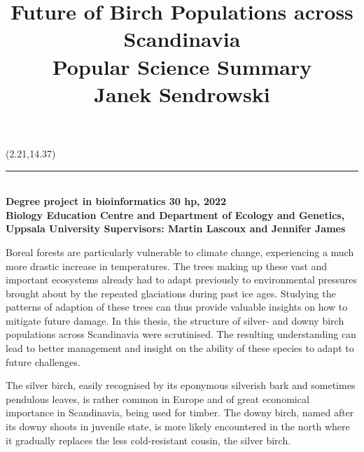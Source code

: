 \documentclass[hidelinks,11pt]{article}
\begin{document}
    \clearpage
    \shipout\null

    \begingroup
    \fontsize{10pt}{12pt}\selectfont

    \setlength{\droptitle}{-1em}
    \title{Future of Birch Populations across Scandinavia\\
    \vspace{0.3em}
    \Large Popular Science Summary\\
    \vspace{0.3em}
    Janek Sendrowski}
    \date{}
    \begin{textblock}{10}(2.21,14.37)
        \begin{flushleft}
            \rule{44.48em}{1pt} \\
            \vspace{-0.02cm}
            \fontsize{9pt}{10.5pt}\color{gray}\textbf{Degree project in bioinformatics 30 hp, 2022 \\
            Biology Education Centre and Department of Ecology and Genetics, \\
            Uppsala University Supervisors: Martin Lascoux and Jennifer James \\}
        \end{flushleft}
    \end{textblock}

    \maketitle
    \vspace{-4.5em}
    Boreal forests are particularly vulnerable to climate change, experiencing a much more drastic increase in temperatures. The trees making up these vast and important ecosystems already had to adapt previously to environmental pressures brought about by the repeated glaciations during past ice ages. Studying the patterns of adaption of these trees can thus provide valuable insights on how to mitigate future damage. In this thesis, the structure of silver-  and downy birch populations across Scandinavia were scrutinised. The resulting understanding can lead to better management and insight on the ability of these species to adapt to future challenges.

    The silver birch, easily recognised by its eponymous silverish bark and sometimes pendulous leaves, is rather common in Europe and of great economical importance in Scandinavia, being used for timber. The downy birch, named after its downy shoots in juvenile state, is more likely encountered in the north where it gradually replaces the less cold-resistant cousin, the silver birch.
\end{document}
